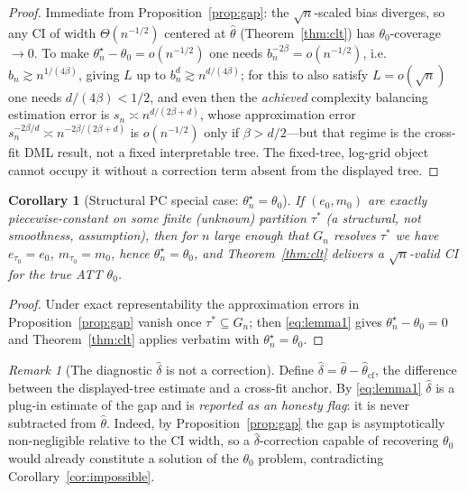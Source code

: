 \documentclass[11pt]{article}
\theoremstyle{plain}
\newtheorem{corollary}{Corollary}
\theoremstyle{definition}
\theoremstyle{remark}
\newtheorem*{remark}{Remark}
\newcommand{\ez}{e_0}
\newcommand{\mz}{m_0}
\newcommand{\etau}{e_{\tau_0}}
\newcommand{\mtau}{m_{\tau_0}}
\newcommand{\thstar}{\theta^{\star}_n}
\newcommand{\htheta}{\hat\theta}
\newcommand{\odiff}{o}
\begin{document}
\begin{proof}
Immediate from Proposition~\ref{prop:gap}: the $\sqrt n$-scaled bias diverges, so
any CI of width $\Theta(n^{-1/2})$ centered at $\htheta$ (Theorem~\ref{thm:clt})
has $\theta_0$-coverage $\to0$. To make $\thstar-\theta_0=\odiff(n^{-1/2})$ one
needs $b_n^{-2\beta}=\odiff(n^{-1/2})$, i.e.\ $b_n\gtrsim n^{1/(4\beta)}$, giving
$L$ up to $b_n^{d}\gtrsim n^{d/(4\beta)}$; for this to also satisfy
$L=\odiff(\sqrt n)$ one needs $d/(4\beta)<1/2$, and even then the \emph{achieved}
complexity balancing estimation error is $s_n\asymp n^{d/(2\beta+d)}$, whose
approximation error $s_n^{-2\beta/d}\asymp n^{-2\beta/(2\beta+d)}$ is
$\odiff(n^{-1/2})$ only if $\beta>d/2$---but that regime is the cross-fit DML
result, not a fixed interpretable tree. The fixed-tree, log-grid object cannot
occupy it without a correction term absent from the displayed tree.
\end{proof}

\begin{corollary}[Structural PC special case: $\thstar=\theta_0$]\label{cor:structural}
If $(\ez,\mz)$ are \emph{exactly} piecewise-constant on some finite (unknown)
partition $\tau^\ast$ (a structural, not smoothness, assumption), then for $n$
large enough that $G_n$ resolves $\tau^\ast$ we have $\etau=\ez$, $\mtau=\mz$,
hence $\thstar=\theta_0$, and Theorem~\ref{thm:clt} delivers a $\sqrt n$-valid CI
for the \emph{true} ATT $\theta_0$.
\end{corollary}

\begin{proof}
Under exact representability the approximation errors in
Proposition~\ref{prop:gap} vanish once $\tau^\ast\subseteq G_n$; then
\eqref{eq:lemma1} gives $\thstar-\theta_0=0$ and Theorem~\ref{thm:clt} applies
verbatim with $\thstar=\theta_0$.
\end{proof}

\begin{remark}[The diagnostic $\hat\delta$ is not a correction]
Define $\hat\delta=\htheta-\htheta_{\mathrm{cf}}$, the difference between the
displayed-tree estimate and a cross-fit anchor. By \eqref{eq:lemma1} $\hat\delta$
is a plug-in estimate of the gap and is \emph{reported as an honesty flag}: it is
never subtracted from $\htheta$. Indeed, by Proposition~\ref{prop:gap} the gap is
asymptotically non-negligible relative to the CI width, so a $\hat\delta$-correction
capable of recovering $\theta_0$ would already constitute a solution of the
$\theta_0$ problem, contradicting Corollary~\ref{cor:impossible}.
\end{remark}
\end{document}
